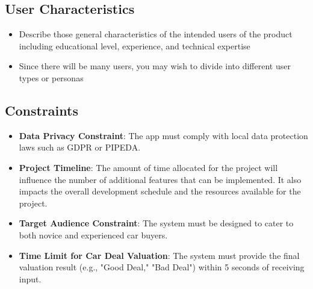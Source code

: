 \documentclass[]{article}
\begin{document}
\subsection{User Characteristics}
\label{sub:user_characteristics}
\begin{itemize}
	\item Describe those general characteristics of the intended users of the product including educational level, experience, and technical expertise 
	\item Since there will be many users, you may wish to divide into different user types or personas
\end{itemize}

\subsection{Constraints}
\label{sub:constraints}
\begin{itemize}
    \item \textbf{Data Privacy Constraint}: The app must comply with local data protection laws such as GDPR or PIPEDA.
    \item \textbf{Project Timeline}: The amount of time allocated for the project will influence the number of additional features that can be implemented. It also impacts the overall development schedule and the resources available for the project.
    \item \textbf{Target Audience Constraint}: The system must be designed to cater to both novice and experienced car buyers.
    \item \textbf{Time Limit for Car Deal Valuation}: The system must provide the final valuation result (e.g., "Good Deal," "Bad Deal") within 5 seconds of receiving input.
\end{itemize}
\end{document}
